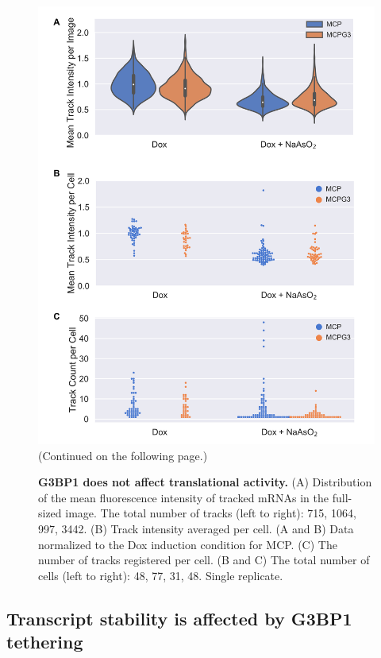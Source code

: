 \begin{figure}[H]
    \vspace*{\fill}
    \centering
    \includegraphics[width=\linewidth]{images/figure4}
    \caption{(Continued on the following page.)}
    \end{figure}
    \addtocounter{figure}{-1}
    \begin{figure} [h]
    \caption{\textbf{G3BP1 does not affect translational activity.}
        (A) Distribution of the mean fluorescence intensity of tracked
            mRNAs in the full-sized image.
            The total number of tracks (left to right): 715, 1064, 997, 3442.
        (B) Track intensity averaged per cell.
        (A and B) Data normalized to the Dox induction condition for MCP.
        (C) The number of tracks registered per cell.
        (B and C) The total number of cells (left to right): 48, 77, 31, 48. Single replicate.
    }
    \label{fig:mcp_suntag}
\end{figure}


\subsection{Transcript stability is affected by G3BP1 tethering} \label{mcp_treat}

